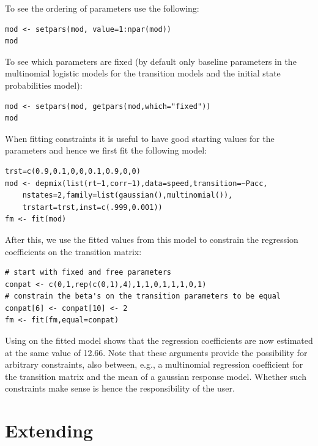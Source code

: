 \documentclass[article]{jss}
\begin{document}
To see the ordering of parameters use the following:
\begin{verbatim}
mod <- setpars(mod, value=1:npar(mod))
mod
\end{verbatim}

To see which parameters are fixed (by default only baseline parameters
in the multinomial logistic models for the transition models and the
initial state probabilities model):
\begin{verbatim}
mod <- setpars(mod, getpars(mod,which="fixed"))
mod
\end{verbatim}

When fitting constraints it is useful to have good starting values 
for the parameters and hence we first fit the following model: 
\begin{verbatim}
trst=c(0.9,0.1,0,0,0.1,0.9,0,0)
mod <- depmix(list(rt~1,corr~1),data=speed,transition=~Pacc,
	nstates=2,family=list(gaussian(),multinomial()),
	trstart=trst,inst=c(.999,0.001))
fm <- fit(mod)
\end{verbatim}
After this, we use the fitted values from this model to constrain the 
regression coefficients on the transition matrix:
\begin{verbatim}
# start with fixed and free parameters
conpat <- c(0,1,rep(c(0,1),4),1,1,0,1,1,1,0,1)
# constrain the beta's on the transition parameters to be equal
conpat[6] <- conpat[10] <- 2
fm <- fit(fm,equal=conpat)
\end{verbatim}
Using  on the fitted model shows that the regression 
coefficients are now estimated at the same value of 12.66. 
Note that these arguments provide the possibility for arbitrary 
constraints, also between, e.g., a multinomial regression coefficient 
for the transition matrix and the mean of a gaussian response model. 
Whether such constraints make sense is hence the responsibility of 
the user. 


\section{Extending }
\end{document}

